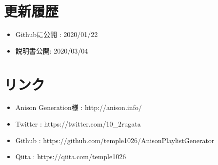 \documentclass[10pt]{ujarticle}
\begin{document}
\section*{更新履歴}
\begin{itemize}
    \item Githubに公開 : 2020/01/22
    \item 説明書公開: 2020/03/04
\end{itemize}

\section*{リンク}
\begin{itemize}
    \item Anison Generation様 : http://anison.info/
    \item Twitter : https://twitter.com/10\_2rugata
    \item Github : https://github.com/temple1026/AnisonPlaylistGenerator
    \item Qiita : https://qiita.com/temple1026
\end{itemize}
\end{document}
